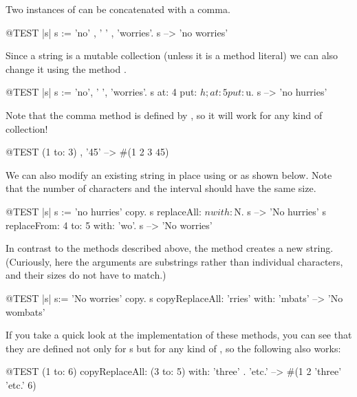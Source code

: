 \documentclass[a4paper,10pt,twoside]{book}
\begin{document}
Two instances of  can be concatenated with a comma.
\begin{code}{@TEST |s|}
s := 'no' , ' ' , 'worries'.
s -->  'no worries'
\end{code}

Since a string is a mutable collection (unless it is a method literal) we can also change it using the method .

\begin{code}{@TEST |s| s := 'no', ' ', 'worries'.}
s at: 4 put: $h; at: 5 put: $u.
s --> 'no hurries'
\end{code}

Note that the comma method is defined by , so it will work for any kind of collection!
\begin{code}{@TEST}
(1 to: 3) , '45' --> #(1 2 3 $4 $5)
\end{code}

We can also modify an existing string in place using  or  as shown below. Note that the number of characters and the interval should have the same size.

\begin{code}{@TEST |s| s := 'no hurries' copy.}
s replaceAll: $n with: $N.
s --> 'No hurries'
s replaceFrom: 4 to: 5 with: 'wo'.
s --> 'No worries'
\end{code}

In contrast to the methods described above, the method  creates a new string.
(Curiously, here the arguments are substrings rather than individual characters, and their sizes do not have to match.)

\begin{code}{@TEST |s| s:= 'No worries' copy.}
s copyReplaceAll: 'rries' with: 'mbats' --> 'No wombats'
\end{code}

If you take a quick look at the implementation of these methods, you can see that they are defined not only for s but for any kind of , so the following also works:

\begin{code}{@TEST}
(1 to: 6) copyReplaceAll: (3 to: 5) with: {'three' . 'etc.'} --> #(1 2 'three' 'etc.' 6)
\end{code}
\end{document}
